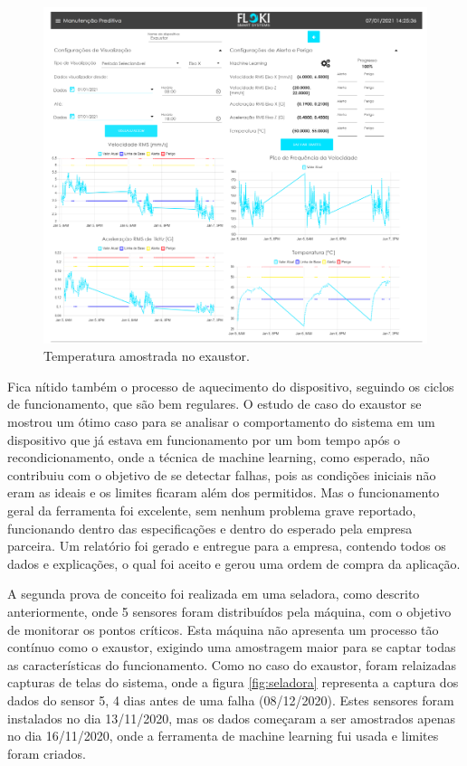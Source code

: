 \begin{figure}[H]
    \caption{Temperatura amostrada no exaustor.}
    \begin{center}
        \includegraphics[scale=0.65, page=3]{resultados/img/resultados.pdf}
    \end{center}
    \label{fig:exaustor_temperatura}
\end{figure}

Fica nítido também o processo de aquecimento do dispositivo, seguindo os ciclos de funcionamento, que são bem regulares. O estudo de caso do 
exaustor se mostrou um ótimo caso para se analisar o comportamento do sistema em um dispositivo que já estava em funcionamento por um bom tempo 
após o recondicionamento, onde a técnica de machine learning, como esperado, não contribuiu com o objetivo de se detectar falhas, pois as
condições iniciais não eram as ideais e os limites ficaram além dos permitidos. Mas o funcionamento geral da ferramenta foi excelente, sem nenhum
problema grave reportado, funcionando dentro das especificações e dentro do esperado pela empresa parceira. Um relatório foi gerado e entregue
para a empresa, contendo todos os dados e explicações, o qual foi aceito e gerou uma ordem de compra da aplicação.

A segunda prova de conceito foi realizada em uma seladora, como descrito anteriormente, onde 5 sensores foram distribuídos pela máquina, com o 
objetivo de monitorar os pontos críticos. Esta máquina não apresenta um processo tão contínuo como o exaustor, exigindo uma amostragem maior
para se captar todas as características do funcionamento. Como no caso do exaustor, foram relaizadas capturas de telas do sistema, onde a figura
\ref{fig:seladora} representa a captura dos dados do sensor 5, 4 dias antes de uma falha (08/12/2020). Estes sensores foram instalados no dia 
13/11/2020, mas  os dados começaram a ser amostrados apenas no dia 16/11/2020, onde a ferramenta de machine learning fui usada e limites foram 
criados. 

